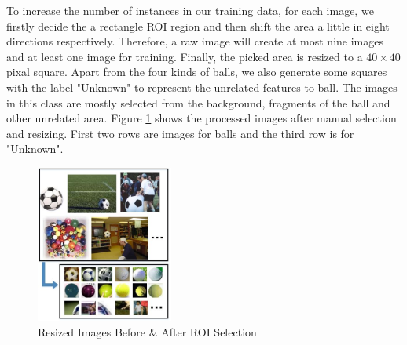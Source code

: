 \documentclass{article}
\begin{document}
To increase the number of instances in our training data, for each image, we firstly decide the a rectangle ROI region and then shift the area a little in eight directions respectively. Therefore, a raw image will create at most nine images and at least one image for training. Finally, the picked area is resized to a $40 \times 40$ pixal square. Apart from the four kinds of balls, we also generate some squares with the label "Unknown" to represent the unrelated features to ball. The images in this class are mostly selected from the background, fragments of the ball and other unrelated area. Figure \ref{fig:ROIResult} shows the processed images after manual selection and resizing. First two rows are images for balls and the third row is for "Unknown".
\begin{figure}[htp]
\centering
\includegraphics[width=0.4\textwidth]{ROISelection.jpg}
\caption{Resized Images Before \& After ROI Selection}
\label{fig:ROIResult}
\end{figure}
\end{document}
